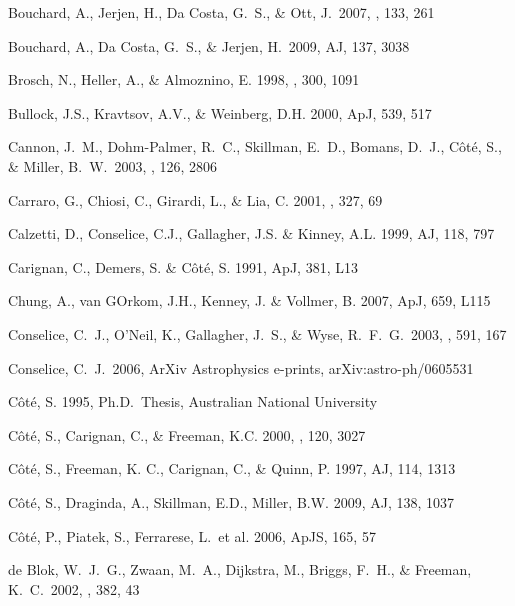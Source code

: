 \documentclass[12pt,preprint]{emulateapj}
\begin{document}
\begin{thebibliography}{}
Bouchard, A., Jerjen, H., Da Costa, G.~S., \& Ott, J.\ 2007, \aj, 133, 261 

Bouchard, A., Da Costa, G.~S., \& Jerjen, H.\ 2009, AJ, 137, 3038

Brosch, N., Heller, A., \& Almoznino, E. 1998, \mnras , 300, 1091

Bullock, J.S., Kravtsov, A.V., \& Weinberg, D.H. 2000, ApJ, 539, 517

Cannon, J.~M., Dohm-Palmer, R.~C., Skillman, E.~D., Bomans, D.~J., 
C{\^o}t{\'e}, S., \& Miller, B.~W.\ 2003, \aj, 126, 2806 

Carraro, G., Chiosi, C., Girardi, L., \& Lia, C. 2001, \mnras, 327, 69 

Calzetti, D., Conselice, C.J., Gallagher, J.S. \& Kinney, A.L. 1999, AJ, 118, 797

Carignan, C., Demers, S. \& C\^ot\'e, S. 1991, ApJ, 381, L13

Chung, A., van GOrkom, J.H., Kenney, J. \& Vollmer, B. 2007, ApJ, 659, L115 

Conselice, C.~J., O'Neil, K., Gallagher, J.~S., \& Wyse, R.~F.~G.\ 2003, \apj, 591, 167 

Conselice, C.~J.\ 2006, ArXiv Astrophysics e-prints, arXiv:astro-ph/0605531 

C\^ot\'e, S. 1995, Ph.D.\ Thesis, Australian National University

C\^ot\'e, S., Carignan, C., \& Freeman, K.C. 2000, \aj , 120, 3027

C\^ot\'e, S., Freeman, K. C., Carignan, C., \& Quinn, P. 1997, AJ, 114, 1313

C\^ot\'e, S., Draginda, A., Skillman, E.D., Miller, B.W. 2009, AJ, 138, 1037

C\^ot\'e, P., Piatek, S., Ferrarese, L.~et al. 2006, ApJS, 165, 57

 de Blok, W.~J.~G., 
Zwaan, M.~A., Dijkstra, M., Briggs, F.~H., \& Freeman, K.~C.\ 2002, \aap, 
382, 43 


\end{thebibliography}
\end{document}
